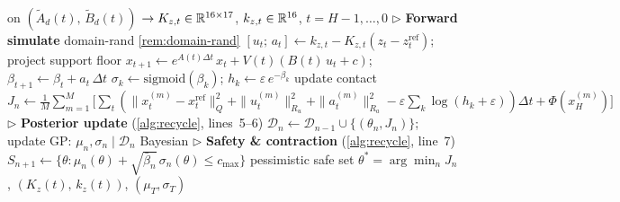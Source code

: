\begin{algorithm}[H]
\begin{algorithmic}[1]
    on $(\tilde{A}_d(t),\, \tilde{B}_d(t))$
    $\to K_{z,t} \in \mathbb{R}^{16 \times 17}$,\;
    $k_{z,t} \in \mathbb{R}^{16}$,\;
    $t = H{-}1, \ldots, 0$
  \Statex \hspace{\algorithmicindent}%
    \textcolor{ConColor}{$\triangleright$ \textbf{Forward simulate}}
    \hfill\textcolor{ConColor}{\small domain-rand
    \cref{rem:domain-rand}}
      \State $[u_t;\, a_t] \gets k_{z,t}
        - K_{z,t}(z_t - z_t^{\mathrm{ref}})$;\;
        project support floor
      \State $x_{t+1} \gets e^{A(t)\Delta t}\,x_t
        + V(t)(B(t)\,u_t + c)$;\;
        $\beta_{t+1} \gets \beta_t + a_t\,\Delta t$
      \State $\sigma_k \gets \mathrm{sigmoid}(\beta_k)$;\;
        $h_k \gets \varepsilon\,e^{-\beta_k}$
        \hfill\textcolor{ConColor}{\small update contact}
    \EndFor
  \EndFor
  \State $J_n \gets \frac{1}{M}\sum_{m=1}^{M}
    \bigl[\sum_t (\|x_t^{(m)}\!-\!x^{\mathrm{ref}}_t\|_Q^2
    + \|u_t^{(m)}\|_{R_u}^2
    + \|a_t^{(m)}\|_{R_a}^2
    - \varepsilon\sum_k\!\log(h_k\!+\!\varepsilon))\Delta t
    + \Phi(x_H^{(m)})\bigr]$
  \Statex \hspace{\algorithmicindent}%
    \textcolor{PostColor}{$\triangleright$ \textbf{Posterior update}
    (\cref{alg:recycle}, lines~5--6)}
  \State $\mathcal{D}_n \gets \mathcal{D}_{n-1}
    \cup \{(\theta_n, J_n)\}$;\;
    update GP: $\mu_n, \sigma_n \mid \mathcal{D}_n$
    \hfill\textcolor{PostColor}{\small Bayesian}
  \Statex \hspace{\algorithmicindent}%
    \textcolor{ConColor}{$\triangleright$ \textbf{Safety \&
    contraction} (\cref{alg:recycle}, line~7)}
  \State $S_{n+1} \gets \bigl\{\theta :
    \mu_n(\theta)
    + \sqrt{\bar\beta_n}\,\sigma_n(\theta)
    \leq c_{\max}\bigr\}$
    \hfill\textcolor{ConColor}{\small pessimistic safe set}
\EndFor
\State \Return $\theta^* = \arg\min_n J_n$,\;
  $(K_z(t),\, k_z(t))$,\;
  $(\mu_T, \sigma_T)$
\end{algorithmic}
\end{algorithm}

